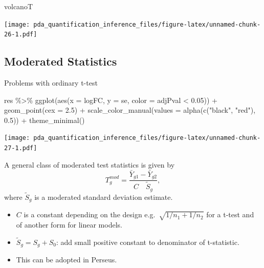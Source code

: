 \documentclass[
]{article}
\newenvironment{Shaded}{\begin{snugshade}}{\end{snugshade}}
\newcommand{\AttributeTok}[1]{\textcolor[rgb]{0.77,0.63,0.00}{#1}}
\newcommand{\FloatTok}[1]{\textcolor[rgb]{0.00,0.00,0.81}{#1}}
\newcommand{\FunctionTok}[1]{\textcolor[rgb]{0.00,0.00,0.00}{#1}}
\newcommand{\NormalTok}[1]{#1}
\newcommand{\SpecialCharTok}[1]{\textcolor[rgb]{0.00,0.00,0.00}{#1}}
\newcommand{\StringTok}[1]{\textcolor[rgb]{0.31,0.60,0.02}{#1}}
\providecommand{\tightlist}{%
  \setlength{\itemsep}{0pt}\setlength{\parskip}{0pt}}
\begin{document}
\begin{Shaded}
\begin{Highlighting}[]
\NormalTok{volcanoT}
\end{Highlighting}
\end{Shaded}

\texttt{[image: pda\_quantification\_inference\_files/figure-latex/unnamed-chunk-26-1.pdf]}

\hypertarget{moderated-statistics}{%
\subsection{Moderated Statistics}\label{moderated-statistics}}

Problems with ordinary t-test

\begin{Shaded}
\begin{Highlighting}[]
\NormalTok{res }\SpecialCharTok{\%\textgreater{}\%} 
  \FunctionTok{ggplot}\NormalTok{(}\FunctionTok{aes}\NormalTok{(}\AttributeTok{x =}\NormalTok{ logFC, }\AttributeTok{y =}\NormalTok{ se, }\AttributeTok{color =}\NormalTok{ adjPval }\SpecialCharTok{\textless{}} \FloatTok{0.05}\NormalTok{)) }\SpecialCharTok{+}
    \FunctionTok{geom\_point}\NormalTok{(}\AttributeTok{cex =} \FloatTok{2.5}\NormalTok{) }\SpecialCharTok{+}
    \FunctionTok{scale\_color\_manual}\NormalTok{(}\AttributeTok{values =} \FunctionTok{alpha}\NormalTok{(}\FunctionTok{c}\NormalTok{(}\StringTok{"black"}\NormalTok{, }\StringTok{"red"}\NormalTok{), }\FloatTok{0.5}\NormalTok{)) }\SpecialCharTok{+}
    \FunctionTok{theme\_minimal}\NormalTok{() }
\end{Highlighting}
\end{Shaded}

\texttt{[image: pda\_quantification\_inference\_files/figure-latex/unnamed-chunk-27-1.pdf]}

A general class of moderated test statistics is given by \[
   T_g^{mod} = \frac{\bar{Y}_{g1} - \bar{Y}_{g2}}{C \quad \tilde{S}_g} ,
 \] where \(\tilde{S}_g\) is a moderated standard deviation estimate.

\begin{itemize}
\tightlist
\item
  \(C\) is a constant depending on the design
  e.g.~\(\sqrt{1/{n_1}+1/n_2}\) for a t-test and of another form for
  linear models.
\item
  \(\tilde{S}_g=S_g+S_0\): add small positive constant to denominator of
  t-statistic.
\item
  This can be adopted in Perseus.
\end{itemize}
\end{document}
